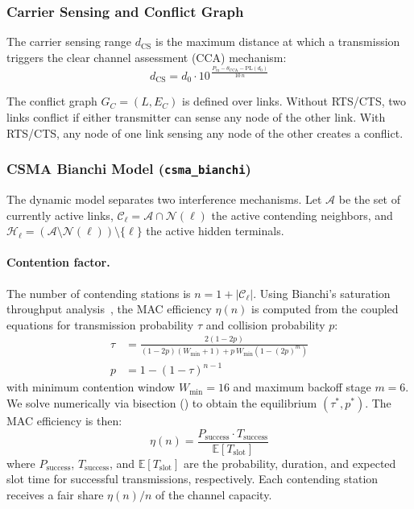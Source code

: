 \documentclass[conference]{IEEEtran}
\begin{document}
\subsubsection{Carrier Sensing and Conflict Graph}

The carrier sensing range $d_\text{CS}$ is the maximum distance at which a
transmission triggers the clear channel assessment (CCA) mechanism:
\begin{equation}
d_\text{CS} = d_0 \cdot 10^{\,\frac{P_\text{tx} - \theta_\text{CCA} - \text{PL}(d_0)}{10\,n}}
\label{eq:csrange}
\end{equation}

The conflict graph $G_C = (L, E_C)$ is defined over links.  Without RTS/CTS,
two links conflict if either transmitter can sense any node of the other
link.  With RTS/CTS, any node of one link sensing any node of the other
creates a conflict.

\subsubsection{CSMA Bianchi Model (\texttt{csma\_bianchi})}
\label{sec:bianchi}

The dynamic model separates two interference mechanisms.  Let $\mathcal{A}$
be the set of currently active links, $\mathcal{C}_\ell = \mathcal{A} \cap
\mathcal{N}(\ell)$ the active contending neighbors, and $\mathcal{H}_\ell =
(\mathcal{A} \setminus \mathcal{N}(\ell)) \setminus \{\ell\}$ the active
hidden terminals.

\paragraph{Contention factor.}
The number of contending stations is $n = 1 + |\mathcal{C}_\ell|$.  Using
Bianchi's saturation throughput analysis~\cite{bianchi2000}, the MAC
efficiency $\eta(n)$ is computed from the coupled equations for transmission
probability $\tau$ and collision probability $p$:
\begin{align}
\tau &= \frac{2(1 - 2p)}{(1 - 2p)(W_{\min} + 1) + p\,W_{\min}(1 - (2p)^m)} \label{eq:tau} \\
p &= 1 - (1 - \tau)^{n-1} \label{eq:p}
\end{align}
with minimum contention window $W_{\min} = 16$ and maximum backoff stage
$m = 6$.  We solve numerically via bisection
() to obtain the equilibrium $(\tau^*, p^*)$.
The MAC efficiency is then:
\begin{equation}
\eta(n) = \frac{P_\text{success} \cdot T_\text{success}}{\mathbb{E}[T_\text{slot}]}
\label{eq:eta}
\end{equation}
where $P_\text{success}$, $T_\text{success}$, and
$\mathbb{E}[T_\text{slot}]$ are the probability, duration, and expected
slot time for successful transmissions, respectively.  Each contending
station receives a fair share $\eta(n)/n$ of the channel capacity.
\end{document}
